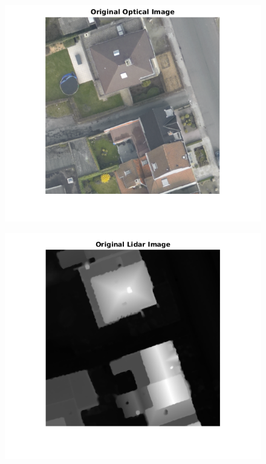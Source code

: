 \begin{figure}
\includegraphics[width=\linewidth]{Optical.png}
\end{figure}

\begin{figure}
\includegraphics[width=\linewidth]{Lidar.png}
\end{figure}

